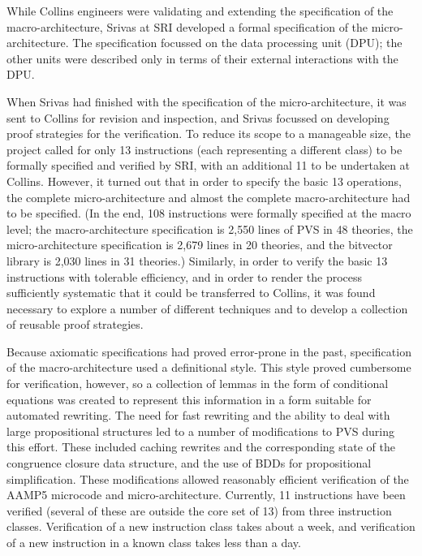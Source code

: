 While Collins engineers were validating and extending the
specification of the macro-architecture, Srivas at SRI developed a
formal specification of the micro-architecture.  The specification
focussed on the data processing unit (DPU); the other units were
described only in terms of their external interactions with the DPU\@.

When Srivas had finished with the specification of the
micro-architecture, it was sent to Collins for revision and
inspection, and Srivas focussed on developing proof strategies for
the verification.  
To reduce its scope to a manageable size, the project called for only
13 instructions (each representing a different class) to be formally
specified and verified by SRI, with an additional 11 to be undertaken
at Collins.  However, it turned out that in order to specify the
basic 13 operations, the complete micro-architecture and almost the
complete macro-architecture had to be specified.  (In the end, 108
instructions were formally specified at the macro level; the 
macro-architecture specification is 2,550 lines of PVS in 48
theories, the micro-architecture specification is 2,679 lines in 20
theories, and the bitvector library is 2,030 lines in 31 theories.)
Similarly, in order to verify the basic 13 instructions with
tolerable efficiency, and in order to render the process sufficiently
systematic that it could be transferred to Collins, it was found
necessary to explore a number of different techniques and to develop
a collection of reusable proof strategies.

Because axiomatic specifications had proved error-prone in the past,
specification of the macro-architecture used a definitional style.
This style proved cumbersome for verification, however, so a
collection of lemmas in the form of conditional equations was created
to represent this information in a form suitable for automated
rewriting.  The need for fast rewriting and the ability to deal with
large propositional structures led to a number of modifications to PVS
during this effort.  These included caching rewrites and the
corresponding state of the congruence closure data structure, and the
use of BDDs for propositional simplification.  These modifications
allowed reasonably efficient verification of the AAMP5 microcode and
micro-architecture.  Currently, 11 instructions have been verified
(several of these are outside the core set of 13) from three
instruction classes.  Verification of a new instruction class takes
about a week, and verification of a new instruction in a known class
takes less than a day.

